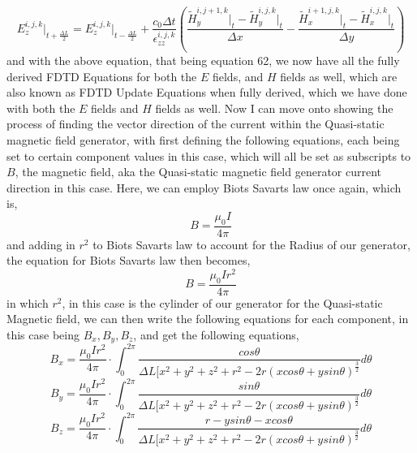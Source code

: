 \documentclass[]{article}
\begin{document}
\begin{equation}
{E}_{z}^{i,j,k}\Big|_{t+\frac{\Delta{L}}{2}} = E_{z}^{i,j,k}\Big|_{t - \frac{\Delta{L}}{2}} + \frac{c_0\Delta{t}}{\epsilon_{zz}^{i,j,k}} \left(\frac{\tilde{H}_{y}^{i, j + 1 , k} \Big|_t - \tilde{H}_{y}^{i,j,k}\Big|_t}{\Delta{x}} - \frac{\tilde{H}_{x}^{i + 1, j, k} \Big|_t - \tilde{H}_{x}^{i,j,k}\Big|_t}{\Delta{y}}\right)
\end{equation}
and with the above equation, that being equation 62, we now have all the fully derived FDTD Equations for both the $E$ fields, and $H$ fields as well, which are also known as FDTD Update Equations when fully derived, which we have done with both the $E$ fields and $H$ fields as well. Now I can move onto showing the process of finding the vector direction of the current within the Quasi-static magnetic field generator, with first defining the following equations, each being set to certain component values in this case, which will all be set as subscripts to $B$, the magnetic field, aka the Quasi-static magnetic field generator current direction in this case. Here, we can employ Biots Savarts law once again, which is,
\begin{equation}
B = \frac{\mu_0I}{4\pi}
\end{equation}
and adding in $r^2$ to Biots Savarts law to account for the Radius of our generator, the equation for Biots Savarts law then becomes,
\begin{equation}
B = \frac{\mu_0Ir^2}{4\pi}
\end{equation}
in which $r^2$, in this case is the cylinder of our generator for the Quasi-static Magnetic field, we can then write the following equations for each component, in this case being $B_x,B_y,B_z$, and get the following equations,
\\
\begin{equation}
B_x = \frac{\mu_0Ir^2}{4\pi} \cdot \int_{0}^{2\pi} \frac{cos\theta}{\Delta{L}[x^2+y^2+z^2+r^2-2r(xcos\theta+ysin\theta)^\frac{3}{2}}d\theta
\end{equation}
\begin{equation}
B_y = \frac{\mu_0Ir^2}{4\pi} \cdot \int_{0}^{2\pi} \frac{sin\theta}{\Delta{L}[x^2+y^2+z^2+r^2-2r(xcos\theta+ysin\theta)^\frac{3}{2}}d\theta
\end{equation}
\begin{equation}
B_z = \frac{\mu_0Ir^2}{4\pi} \cdot \int_{0}^{2\pi} \frac{r-ysin\theta-xcos\theta}{\Delta{L}[x^2+y^2+z^2+r^2-2r(xcos\theta+ysin\theta)^\frac{3}{2}}d\theta
\end{equation}
\end{document}
